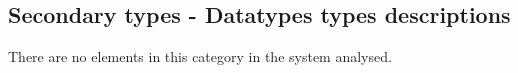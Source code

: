 \subsection{Secondary types - Datatypes types descriptions}



There are no elements in this category in the system analysed.


